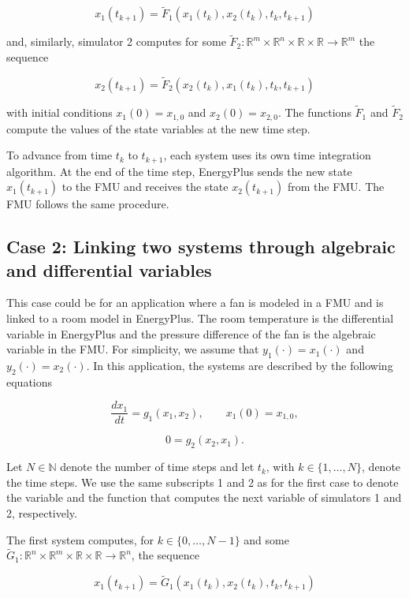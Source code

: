 \[
x_1(t_{k+1}) = \tilde{F}_1\left(x_1(t_k),x_2(t_k),t_k,t_{k+1}\right)
\]

and, similarly, simulator 2 computes for some \(\tilde{F}_2: \mathbb{R}^{m} \times \mathbb{R}^{n} \times \mathbb{R} \times \mathbb{R} \to \mathbb{R}^{m}\) the sequence

\[
x_2(t_{k+1}) = \tilde{F}_2\left(x_2(t_k),x_1(t_k),t_k,t_{k+1}\right)
\]

with initial conditions \(x_1(0) = x_{1,0}\) and \(x_2(0) = x_{2,0}\). The functions \(\tilde{F}_1\) and \(\tilde{F}_2\) compute the values of the state variables at the new time step.

To advance from time \(t_k\) to \(t_{k+1}\), each system uses its own time integration algorithm. At the end of the time step, EnergyPlus sends the new state \(x_1(t_{k+1})\) to the FMU and receives the state \(x_2(t_{k+1})\) from the FMU. The FMU follows the same procedure.

\subsection{Case 2: Linking two systems through algebraic and differential variables}\label{case-2-linking-two-systems-through-algebraic-and-differential-variables}

This case could be for an application where a fan is modeled in a FMU and is linked to a room model in EnergyPlus. The room temperature is the differential variable in EnergyPlus and the pressure difference of the fan is the algebraic variable in the FMU. For simplicity, we assume that \(y_1(\cdot) = x_1(\cdot)\) and \(y_2(\cdot) = x_2(\cdot)\). In this application, the systems are described by the following equations

\[
\frac{dx_1}{dt} = g_1(x_1,x_2),
\qquad
x_1(0) = x_{1,0},
\]

\[
0 = g_2(x_2,x_1).
\]

Let \(N \in \mathbb{N}\) denote the number of time steps and let \(t_k\), with \(k \in \{1,\ldots,N\}\), denote the time steps. We use the same subscripts 1 and 2 as for the first case to denote the variable and the function that computes the next variable of simulators 1 and 2, respectively.

The first system computes, for \(k \in \{0,\ldots,N-1\}\) and some \(\tilde{G}_1: \mathbb{R}^{n} \times \mathbb{R}^{m} \times \mathbb{R} \times \mathbb{R} \to \mathbb{R}^{n}\), the sequence

\[
x_1(t_{k+1}) = \tilde{G}_1\left(x_1(t_k),x_2(t_k),t_k,t_{k+1}\right)
\]

